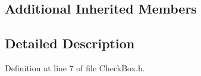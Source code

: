 \subsection*{Additional Inherited Members}


\subsection{Detailed Description}


Definition at line 7 of file Check\+Box.\+h.

